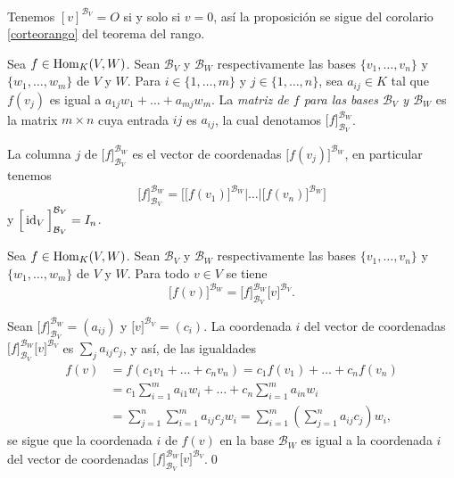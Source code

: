 \dem Tenemos $\left[ v \right]^{\mathcal{B}_V}=O$ si y solo si $v=0$, as\'i la proposici\'on se sigue del corolario \ref{corteorango} del teorema del rango. 

\begin{defn}
Sea $f\in\operatorname{Hom}_K(V,W)$. Sean $\mathcal{B}_V$ y $\mathcal{B}_W$ respectivamente las bases $\{v_1,\ldots,v_n\}$ y $\{w_1,\ldots,w_m\}$ de $V$ y $W$. Para $i\in\{1,\ldots,m\}$ y $j\in\{1,\ldots,n\}$, sea $a_{ij}\in K$ tal que $f(v_j)$ es igual a $a_{1j}w_1+\ldots+a_{mj}w_m$. La \emph{matriz de $f$ para las bases $\mathcal{B}_V$ y $\mathcal{B}_W$} es la matrix $m\times n$ cuya entrada $ij$ es $a_{ij}$, la cual denotamos $\Big[ f \Big]^{\mathcal{B}_W}_{\mathcal{B}_V}$.
\end{defn}

\begin{obs}
La columna $j$ de $\Big[ f \Big]^{\mathcal{B}_W}_{\mathcal{B}_V}$ es el vector de coordenadas $\Big[f(v_j)\Big]^{\mathcal{B}_W}$, en particular tenemos 
$$\Big[f\Big]^{\mathcal{B}_W}_{\mathcal{B}_V}=\Bigg[\Big[ f(v_1)\Big]^{\mathcal{B}_W}\Big|\ldots \Big| \Big[ f(v_n)\Big]^{\mathcal{B}_W}\Bigg]$$
y $\Big[\operatorname{id}_V\Big]^{\mathcal{B}_V}_{\mathcal{B}_V}=I_n$.
\end{obs}

\begin{pro}
Sea $f\in\operatorname{Hom}_K(V,W)$. Sean $\mathcal{B}_V$ y $\mathcal{B}_W$ respectivamente las bases $\{v_1,\ldots,v_n\}$ y $\{w_1,\ldots,w_m\}$ de $V$ y $W$. Para todo $v\in V$ se tiene
$$\Big[ f(v)\Big]^{\mathcal{B}_W}=\Big[ f \Big]^{\mathcal{B}_W}_{\mathcal{B}_V}\Big[ v \Big]^{\mathcal{B}_V}.$$
\end{pro}

\dem Sean $\Big[ f \Big]^{\mathcal{B}_W}_{\mathcal{B}_V}=(a_{ij})$ y $\Big[v\Big]^{\mathcal{B}_V}=(c_i)$. La coordenada $i$ del vector de coordenadas $\Big[ f \Big]^{\mathcal{B}_W}_{\mathcal{B}_V}\Big[ v \Big]^{\mathcal{B}_V}$ es $\sum_j a_{ij}c_j$, y as\'i, de las igualdades
\begin{align*}
f(v) & = f(c_1v_1+\ldots+c_nv_n)=c_1f(v_1)+\ldots+c_nf(v_n)\\
 & = c_1\sum_{i=1}^m a_{i1}w_i+\ldots+c_n\sum_{i=1}^m a_{in}w_i\\
 & = \sum_{j=1}^n\sum_{i=1}^m a_{ij}c_jw_i=\sum_{i=1}^m\left(\sum_{j=1}^n a_{ij}c_j\right)w_i,
\end{align*}
se sigue que la coordenada $i$ de $f(v)$ en la base $\mathcal{B}_W$ es igual a la coordenada $i$ del vector de coordenadas  $\Big[ f \Big]^{\mathcal{B}_W}_{\mathcal{B}_V}\Big[ v \Big]^{\mathcal{B}_V}$.\qed


